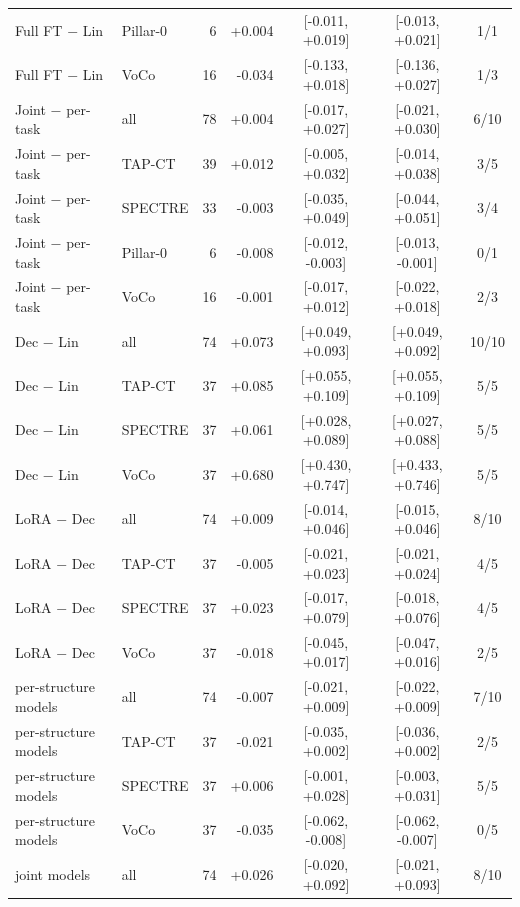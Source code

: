 \begin{tabular}{llrrccc}
Full FT $-$ Lin & Pillar-0 & 6 & +0.004 & [-0.011, +0.019] & [-0.013, +0.021] & 1/1 \\
Full FT $-$ Lin & VoCo & 16 & -0.034 & [-0.133, +0.018] & [-0.136, +0.027] & 1/3 \\
\addlinespace[2pt]
Joint $-$ per-task & all & 78 & +0.004 & [-0.017, +0.027] & [-0.021, +0.030] & 6/10 \\
Joint $-$ per-task & TAP-CT & 39 & +0.012 & [-0.005, +0.032] & [-0.014, +0.038] & 3/5 \\
Joint $-$ per-task & SPECTRE & 33 & -0.003 & [-0.035, +0.049] & [-0.044, +0.051] & 3/4 \\
Joint $-$ per-task & Pillar-0 & 6 & -0.008 & [-0.012, -0.003] & [-0.013, -0.001] & 0/1 \\
Joint $-$ per-task & VoCo & 16 & -0.001 & [-0.017, +0.012] & [-0.022, +0.018] & 2/3 \\
\addlinespace[2pt]
Dec $-$ Lin & all & 74 & +0.073 & [+0.049, +0.093] & [+0.049, +0.092] & 10/10 \\
Dec $-$ Lin & TAP-CT & 37 & +0.085 & [+0.055, +0.109] & [+0.055, +0.109] & 5/5 \\
Dec $-$ Lin & SPECTRE & 37 & +0.061 & [+0.028, +0.089] & [+0.027, +0.088] & 5/5 \\
Dec $-$ Lin & VoCo & 37 & +0.680 & [+0.430, +0.747] & [+0.433, +0.746] & 5/5 \\
\addlinespace[2pt]
LoRA $-$ Dec & all & 74 & +0.009 & [-0.014, +0.046] & [-0.015, +0.046] & 8/10 \\
LoRA $-$ Dec & TAP-CT & 37 & -0.005 & [-0.021, +0.023] & [-0.021, +0.024] & 4/5 \\
LoRA $-$ Dec & SPECTRE & 37 & +0.023 & [-0.017, +0.079] & [-0.018, +0.076] & 4/5 \\
LoRA $-$ Dec & VoCo & 37 & -0.018 & [-0.045, +0.017] & [-0.047, +0.016] & 2/5 \\
\addlinespace[2pt]
\quad per-structure models & all & 74 & -0.007 & [-0.021, +0.009] & [-0.022, +0.009] & 7/10 \\
\quad per-structure models & TAP-CT & 37 & -0.021 & [-0.035, +0.002] & [-0.036, +0.002] & 2/5 \\
\quad per-structure models & SPECTRE & 37 & +0.006 & [-0.001, +0.028] & [-0.003, +0.031] & 5/5 \\
\quad per-structure models & VoCo & 37 & -0.035 & [-0.062, -0.008] & [-0.062, -0.007] & 0/5 \\
\addlinespace[2pt]
\quad joint models & all & 74 & +0.026 & [-0.020, +0.092] & [-0.021, +0.093] & 8/10 \\

\end{tabular}
